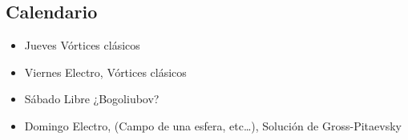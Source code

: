 \documentclass[10pt,letterpaper]{article}
\begin{document}
\subsection{Calendario}
\begin{itemize}
\item Jueves Vórtices clásicos
\item Viernes Electro, Vórtices clásicos
\item Sábado Libre ¿Bogoliubov?
\item Domingo Electro, (Campo de una esfera, etc…), Solución de Gross-Pitaevsky
\end{itemize}



\end{document}
